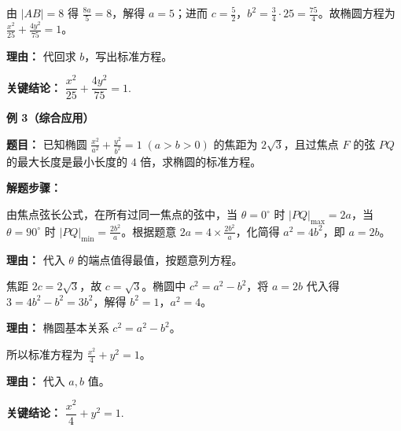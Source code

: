 \begin{examplebox}
\begin{description}[style=nextline, leftmargin=2.8em, labelsep=0.5em, itemsep=0.45em]
		\item[\textbf{第三步（求解参数）：}] 由 $|AB| = 8$ 得 $\frac{8a}{5}=8$，解得 $a=5$；进而 $c=\frac52$，$b^2=\frac34\cdot25=\frac{75}{4}$。故椭圆方程为 $\frac{x^2}{25}+\frac{4y^2}{75}=1$。
		      \par\textbf{理由：} 代回求 $b$，写出标准方程。
	\end{description}

	\textbf{\textcolor{CExample}{关键结论：}} \textbf{$\dfrac{x^2}{25}+\dfrac{4y^2}{75}=1$}.

	\medskip
	\textbf{\textcolor{CExample}{例 3（综合应用）}}

	\textbf{\textcolor{CExample}{题目：}} 已知椭圆 $\frac{x^2}{a^2}+\frac{y^2}{b^2}=1\;(a>b>0)$ 的焦距为 $2\sqrt3$，且过焦点 $F$ 的弦 $PQ$ 的最大长度是最小长度的 $4$ 倍，求椭圆的标准方程。

	\textbf{\textcolor{CExample}{解题步骤：}}
	\begin{description}[style=nextline, leftmargin=2.8em, labelsep=0.5em, itemsep=0.45em]
		\item[\textbf{第一步（最值关系）：}] 由焦点弦长公式，在所有过同一焦点的弦中，当 $\theta=0^\circ$ 时 $|PQ|_{\max}=2a$，当 $\theta=90^\circ$ 时 $|PQ|_{\min}=\frac{2b^2}{a}$。根据题意 $2a=4\times\frac{2b^2}{a}$，化简得 $a^2=4b^2$，即 $a=2b$。
		      \par\textbf{理由：} 代入 $\theta$ 的端点值得最值，按题意列方程。

		\item[\textbf{第二步（利用焦距）：}] 焦距 $2c=2\sqrt3$，故 $c=\sqrt3$。椭圆中 $c^2=a^2-b^2$，将 $a=2b$ 代入得 $3=4b^2-b^2=3b^2$，解得 $b^2=1$，$a^2=4$。
		      \par\textbf{理由：} 椭圆基本关系 $c^2=a^2-b^2$。

		\item[\textbf{第三步（写出方程）：}] 所以标准方程为 $\frac{x^2}{4}+y^2=1$。
		      \par\textbf{理由：} 代入 $a,b$ 值。
	\end{description}

	\textbf{\textcolor{CExample}{关键结论：}} \textbf{$\dfrac{x^2}{4}+y^2=1$}.

\end{examplebox}